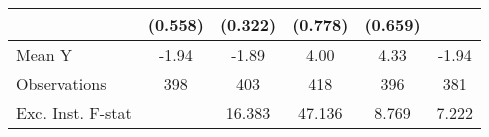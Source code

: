 {\begin{tabular}{l*{5}{c}}
            &     (0.558)         &     (0.322)         &     (0.778)         &     (0.659)         &                     \\
\midrule
Mean Y      &       -1.94         &       -1.89         &        4.00         &        4.33         &       -1.94         \\
Observations&         398         &         403         &         418         &         396         &         381         \\
Exc. Inst. F-stat&                     &      16.383         &      47.136         &       8.769         &       7.222         \\
\bottomrule
\end{tabular}
}
